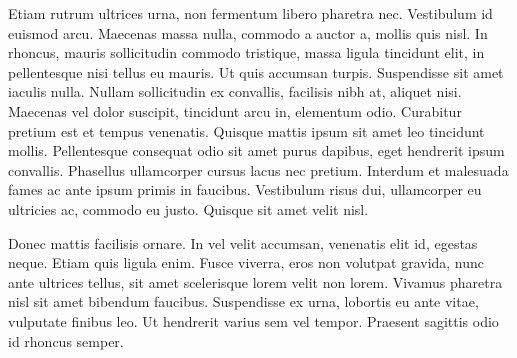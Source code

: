 \documentclass[12pt, a4paper]{report}
\begin{document}
Etiam rutrum ultrices urna, non fermentum libero pharetra nec. Vestibulum id euismod arcu. Maecenas massa nulla, commodo a auctor a, mollis quis nisl. In rhoncus, mauris sollicitudin commodo tristique, massa ligula tincidunt elit, in pellentesque nisi tellus eu mauris. Ut quis accumsan turpis. Suspendisse sit amet iaculis nulla. Nullam sollicitudin ex convallis, facilisis nibh at, aliquet nisi. Maecenas vel dolor suscipit, tincidunt arcu in, elementum odio. Curabitur pretium est et tempus venenatis. Quisque mattis ipsum sit amet leo tincidunt mollis. Pellentesque consequat odio sit amet purus dapibus, eget hendrerit ipsum convallis. Phasellus ullamcorper cursus lacus nec pretium. Interdum et malesuada fames ac ante ipsum primis in faucibus. Vestibulum risus dui, ullamcorper eu ultricies ac, commodo eu justo. Quisque sit amet velit nisl.

Donec mattis facilisis ornare. In vel velit accumsan, venenatis elit id, egestas neque. Etiam quis ligula enim. Fusce viverra, eros non volutpat gravida, nunc ante ultrices tellus, sit amet scelerisque lorem velit non lorem. Vivamus pharetra nisl sit amet bibendum faucibus. Suspendisse ex urna, lobortis eu ante vitae, vulputate finibus leo. Ut hendrerit varius sem vel tempor. Praesent sagittis odio id rhoncus semper.
\end{document}
